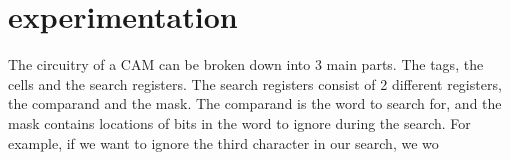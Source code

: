 \section{experimentation}
The circuitry of a CAM can be broken down into 3 main parts. The tags, the cells and the search registers. 
The search registers consist of 2 different registers, the comparand and the mask. 
The comparand is the word to search for, and the mask contains locations of bits in the word to ignore during the search.
For example, if we want to ignore the third character in our search, we wo